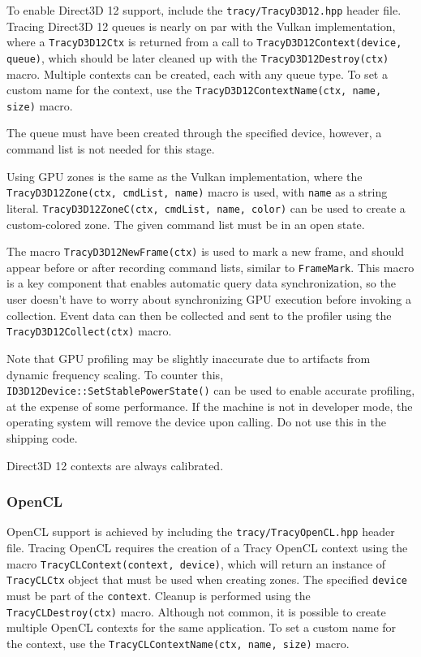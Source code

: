 \documentclass[hidelinks,titlepage,a4paper]{article}
\begin{document}
To enable Direct3D 12 support, include the \texttt{tracy/TracyD3D12.hpp} header file. Tracing Direct3D 12 queues is nearly on par with the Vulkan implementation, where a \texttt{TracyD3D12Ctx} is returned from a call to \texttt{TracyD3D12Context(device, queue)}, which should be later cleaned up with the \texttt{TracyD3D12Destroy(ctx)} macro. Multiple contexts can be created, each with any queue type. To set a custom name for the context, use the \texttt{TracyD3D12ContextName(ctx, name, size)} macro.

The queue must have been created through the specified device, however, a command list is not needed for this stage.

Using GPU zones is the same as the Vulkan implementation, where the \texttt{TracyD3D12Zone(ctx, cmdList, name)} macro is used, with \texttt{name} as a string literal. \texttt{TracyD3D12ZoneC(ctx, cmdList, name, color)} can be used to create a custom-colored zone. The given command list must be in an open state.

The macro \texttt{TracyD3D12NewFrame(ctx)} is used to mark a new frame, and should appear before or after recording command lists, similar to \texttt{FrameMark}. This macro is a key component that enables automatic query data synchronization, so the user doesn't have to worry about synchronizing GPU execution before invoking a collection. Event data can then be collected and sent to the profiler using the \texttt{TracyD3D12Collect(ctx)} macro.

Note that GPU profiling may be slightly inaccurate due to artifacts from dynamic frequency scaling. To counter this, \texttt{ID3D12Device::SetStablePowerState()} can be used to enable accurate profiling, at the expense of some performance. If the machine is not in developer mode, the operating system will remove the device upon calling. Do not use this in the shipping code.

Direct3D 12 contexts are always calibrated.

\subsubsection{OpenCL}

OpenCL support is achieved by including the \texttt{tracy/TracyOpenCL.hpp} header file. Tracing OpenCL requires the creation of a Tracy OpenCL context using the macro \texttt{TracyCLContext(context, device)}, which will return an instance of \texttt{TracyCLCtx} object that must be used when creating zones. The specified \texttt{device} must be part of the \texttt{context}. Cleanup is performed using the \texttt{TracyCLDestroy(ctx)} macro. Although not common, it is possible to create multiple OpenCL contexts for the same application. To set a custom name for the context, use the \texttt{TracyCLContextName(ctx, name, size)} macro.
\end{document}
